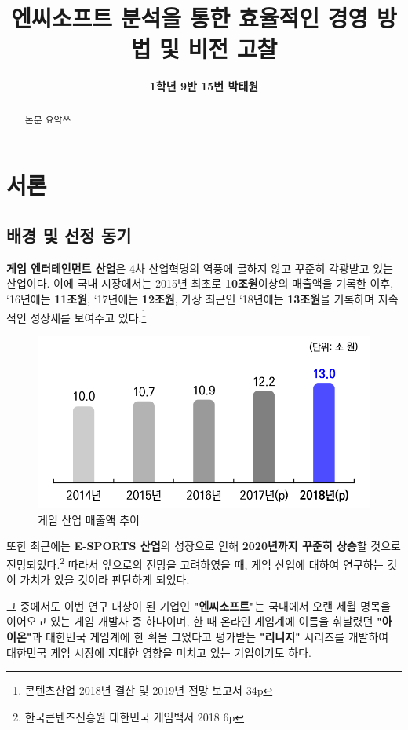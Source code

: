 \documentclass[11pt]{oblivoir}
\title{\textbf{엔씨소프트 분석을 통한 효율적인 경영 방법 및 비전 고찰}}
\author{\textbf{1학년 9반 15번 박태원}}
\begin{document}
	
	\begin{center}
		\maketitle
		\begin{abstract}
			논문 요약쓰		
		\end{abstract}
		\tableofcontents
		\pagebreak
	\end{center}


	\section{서론}
		\subsection{배경 및 선정 동기}
			\textbf{게임 엔터테인먼트 산업}은 4차 산업혁명의 역풍에 굴하지 않고 꾸준히 각광받고 있는 산업이다. 이에 국내 시장에서는 2015년 최초로 \textbf{10조원}이상의 매출액을 기록한 이후, `16년에는 \textbf{11조원}, `17년에는 \textbf{12조원}, 가장 최근인 `18년에는 \textbf{13조원}을 기록하며 지속적인 성장세를 보여주고 있다.\footnote{콘텐츠산업 2018년 결산 및 2019년 전망 보고서 34p}
			
			\begin{figure}[htbp]
				\centering
				\includegraphics[width=1\textwidth]{GameMaechul.png}
				\caption{게임 산업 매출액 추이}
			\end{figure}
			
			또한 최근에는 \textbf{E-SPORTS 산업}의 성장으로 인해 \textbf{2020년까지 꾸준히 상승}할 것으로 전망되었다.\footnote{한국콘텐츠진흥원 대한민국 게임백서 2018 6p} 
			따라서 앞으로의 전망을 고려하였을 때, 게임 산업에 대하여 연구하는 것이 가치가 있을 것이라 판단하게 되었다.
			
			그 중에서도 이번 연구 대상이 된 기업인 \textbf{"엔씨소프트"}는 국내에서 오랜 세월 명목을 이어오고 있는 게임 개발사 중 하나이며, 한 때 온라인 게임계에 이름을 휘날렸던 \textbf{"아이온"}과 대한민국 게임계에 한 획을 그었다고 평가받는 \textbf{"리니지"} 시리즈를 개발하여 대한민국 게임 시장에 지대한 영향을 미치고 있는 기업이기도 하다. 
			
\end{document}
